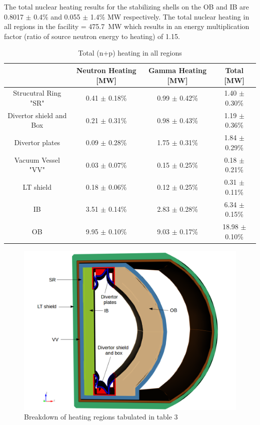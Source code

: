 \documentclass[12pt, letterpaper]{elsarticle}
\begin{document}
The total nuclear heating results for the stabilizing shells on the OB and IB are 0.8017 $\pm$ 0.4\% and 0.055 $\pm$ 1.4\% MW respectively. The total nuclear heating in all regions in the facility = \SI{475.7}{MW} which results in an energy multiplication factor (ratio of source neutron energy to heating) of 1.15. 
\begin{table}[h!]
	\caption{Total (n+p) heating in all regions}
	\label{n+p_heating}
	\begin{tabular}{ |c|c|c|c| } 
		\hline
		 {} & Neutron Heating [MW] & Gamma Heating [MW] & Total [MW] \\
		\hline
		{Strucutral Ring "SR"} & 0.41 $\pm$ 0.18\% & 0.99 $\pm$ 0.42\% & 1.40 $\pm$ 0.30\% \\
		\hline
		{Divertor shield and Box} & 0.21 $\pm$ 0.31\% & 0.98 $\pm$ 0.43\% & 1.19 $\pm$ 0.36\% \\
		\hline
		{Divertor plates} & 0.09 $\pm$ 0.28\% & 1.75 $\pm$ 0.31\% & 1.84 $\pm$ 0.29\% \\
		\hline
		{Vacuum Vessel "VV"} & 0.03 $\pm$ 0.07\% & 0.15 $\pm$ 0.25\% & 0.18 $\pm$ 0.21\% \\
		\hline
		{LT shield} & 0.18 $\pm$ 0.06\% & 0.12 $\pm$ 0.25\% & 0.31 $\pm$ 0.11\% \\
		\hline
		{IB} & 3.51 $\pm$ 0.14\% & 2.83 $\pm$ 0.28\% & 6.34 $\pm$ 0.15\% \\
		\hline
		{OB} & 9.95 $\pm$ 0.10\% & 9.03 $\pm$ 0.17\% & 18.98 $\pm$ 0.10\% \\
		\hline
	\end{tabular}
\end{table}
\begin{figure}[h!]
  \centering
  \includegraphics[scale=0.4]{../plots/heating_regions.png}
  \caption{Breakdown of heating regions tabulated in table 3}
  \label{fig:Heating regions}
\end{figure}
\end{document}
